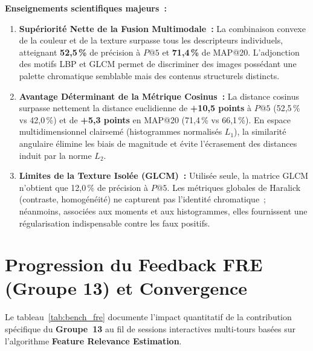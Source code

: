 \noindent\textbf{Enseignements scientifiques majeurs~:}
\begin{enumerate}
    \item \textbf{Supériorité Nette de la Fusion Multimodale~:} La combinaison convexe de la couleur et de la texture surpasse tous les descripteurs individuels, atteignant \textbf{52,5\,\%} de précision à $P@5$ et \textbf{71,4\,\%} de MAP@20. L'adjonction des motifs LBP et GLCM permet de discriminer des images possédant une palette chromatique semblable mais des contenus structurels distincts.
    \item \textbf{Avantage Déterminant de la Métrique Cosinus~:} La distance cosinus surpasse nettement la distance euclidienne de \textbf{+10,5 points} à $P@5$ (52,5\,\% vs 42,0\,\%) et de \textbf{+5,3 points} en MAP@20 (71,4\,\% vs 66,1\,\%). En espace multidimensionnel clairsemé (histogrammes normalisés $L_1$), la similarité angulaire élimine les biais de magnitude et évite l'écrasement des distances induit par la norme $L_2$.
    \item \textbf{Limites de la Texture Isolée (GLCM)~:} Utilisée seule, la matrice GLCM n'obtient que 12,0\,\% de précision à $P@5$. Les métriques globales de Haralick (contraste, homogénéité) ne capturent pas l'identité chromatique~; néanmoins, associées aux moments et aux histogrammes, elles fournissent une régularisation indispensable contre les faux positifs.
\end{enumerate}

\section{Progression du Feedback FRE (Groupe 13) et Convergence}

Le tableau~\ref{tab:bench_fre} documente l'impact quantitatif de la contribution spécifique du \textbf{Groupe~13} au fil de sessions interactives multi-tours basées sur l'algorithme \textbf{Feature Relevance Estimation}.

